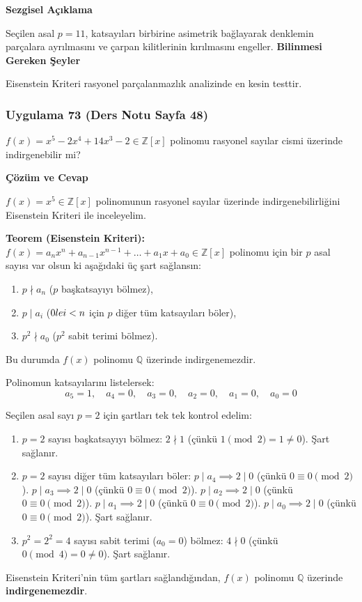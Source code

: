 \documentclass[11pt, a4paper]{article}
\newenvironment{cozum}{
    \vspace{0.5cm}
    \noindent\textcolor{green!60!black}{\faCheckCircle\enspace \textbf{\Large Çözüm ve Cevap}}\par\vspace{0.2cm}
}{}
\newenvironment{sezgisel}{
    \vspace{0.5cm}
    \noindent\textcolor{orange!80!black}{\faLightbulb\enspace \textbf{\Large Sezgisel Açıklama}}\par\vspace{0.2cm}
    \itshape
}{}
\newenvironment{bilgi}{
    \vspace{0.5cm}
    \noindent\textcolor{red!70!black}{\faExclamationTriangle\enspace \textbf{\Large Bilinmesi Gereken Şeyler}}\par\vspace{0.2cm}
}{}
\begin{document}
\begin{sezgisel}
Seçilen asal $p=11$, katsayıları birbirine asimetrik bağlayarak denklemin parçalara ayrılmasını ve çarpan kilitlerinin kırılmasını engeller.
\end{sezgisel}
\begin{bilgi}
Eisenstein Kriteri rasyonel parçalanmazlık analizinde en kesin testtir.
\end{bilgi}

\newpage
\subsubsection{Uygulama 73 (Ders Notu Sayfa 48)}
\begin{sorubox}
$f(x) = x^5 - 2x^4 + 14x^3 - 2 \in \mathbb{Z}[x]$ polinomu rasyonel sayılar cismi üzerinde indirgenebilir mi?
\end{sorubox}
\begin{cozum}
$f(x) = x^{5} \in \mathbb{Z}[x]$ polinomunun rasyonel sayılar üzerinde indirgenebilirliğini Eisenstein Kriteri ile inceleyelim.

\textbf{Teorem (Eisenstein Kriteri):} $f(x) = a_n x^n + a_{n-1} x^{n-1} + \dots + a_1 x + a_0 \in \mathbb{Z}[x]$ polinomu için bir $p$ asal sayısı var olsun ki aşağıdaki üç şart sağlansın:
\begin{enumerate}
    \item $p \nmid a_n$ ($p$ başkatsayıyı bölmez),
    \item $p \mid a_i$ ($0 \\le i < n$ için $p$ diğer tüm katsayıları böler),
    \item $p^2 \nmid a_0$ ($p^2$ sabit terimi bölmez).
\end{enumerate}
Bu durumda $f(x)$ polinomu $\mathbb{Q}$ üzerinde indirgenemezdir.

Polinomun katsayılarını listelersek:
\[ a_{5} = 1, \quad a_{4} = 0, \quad a_{3} = 0, \quad a_{2} = 0, \quad a_{1} = 0, \quad a_{0} = 0 \]

Seçilen asal sayı $p = 2$ için şartları tek tek kontrol edelim:
\begin{enumerate}
    \item $p = 2$ sayısı başkatsayıyı bölmez: $2 \nmid 1$ (çünkü $1 \pmod{2} = 1 \neq 0$). Şart sağlanır.
    \item $p = 2$ sayısı diğer tüm katsayıları böler:
    $p \mid a_{4} \implies 2 \mid 0$ (çünkü $0 \equiv 0 \pmod{2}$).
    $p \mid a_{3} \implies 2 \mid 0$ (çünkü $0 \equiv 0 \pmod{2}$).
    $p \mid a_{2} \implies 2 \mid 0$ (çünkü $0 \equiv 0 \pmod{2}$).
    $p \mid a_{1} \implies 2 \mid 0$ (çünkü $0 \equiv 0 \pmod{2}$).
    $p \mid a_{0} \implies 2 \mid 0$ (çünkü $0 \equiv 0 \pmod{2}$).
    Şart sağlanır.
    \item $p^2 = 2^2 = 4$ sayısı sabit terimi ($a_0 = 0$) bölmez: $4 \nmid 0$ (çünkü $0 \pmod{4} = 0 \neq 0$). Şart sağlanır.
\end{enumerate}

Eisenstein Kriteri'nin tüm şartları sağlandığından, $f(x)$ polinomu $\mathbb{Q}$ üzerinde \textbf{indirgenemezdir}.
\end{cozum}
\end{document}
